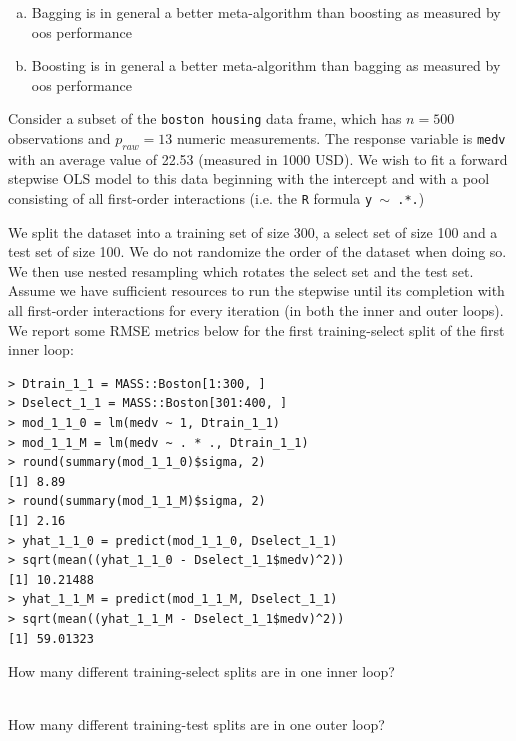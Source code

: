\documentclass[12pt]{article}
\begin{document}
\begin{enumerate}[(a)]
\item[] Bagging is in general a better meta-algorithm than boosting as measured by oos performance
\item[] Boosting is in general a better meta-algorithm than bagging as measured by oos performance
\end{enumerate}
\pagebreak

\eenum

\problem Consider a subset of the \texttt{boston housing} data frame, which has $n = 500$ observations and $p_{raw} = 13$ numeric measurements. The response variable is \texttt{medv} with an average value of 22.53 (measured in 1000 USD). We wish to fit a forward stepwise OLS model to this data beginning with the intercept and with a pool consisting of all first-order interactions (i.e. the \texttt{R} formula \texttt{y $\sim$ .*.}) 

We split the dataset into a training set of size 300, a select set of size 100 and a test set of size 100. We do not randomize the order of the dataset when doing so. We then use nested resampling which rotates the select set and the test set. Assume we have sufficient resources to run the stepwise until its completion with all first-order interactions for every iteration (in both the inner and outer loops). We report some RMSE metrics below for the first training-select split of the first inner loop:

\begin{Verbatim}[frame=single]
> Dtrain_1_1 = MASS::Boston[1:300, ]
> Dselect_1_1 = MASS::Boston[301:400, ]
> mod_1_1_0 = lm(medv ~ 1, Dtrain_1_1)
> mod_1_1_M = lm(medv ~ . * ., Dtrain_1_1)
> round(summary(mod_1_1_0)$sigma, 2)
[1] 8.89
> round(summary(mod_1_1_M)$sigma, 2)
[1] 2.16
> yhat_1_1_0 = predict(mod_1_1_0, Dselect_1_1)
> sqrt(mean((yhat_1_1_0 - Dselect_1_1$medv)^2))
[1] 10.21488
> yhat_1_1_M = predict(mod_1_1_M, Dselect_1_1)
> sqrt(mean((yhat_1_1_M - Dselect_1_1$medv)^2))
[1] 59.01323
\end{Verbatim}

\benum

 How many different training-select splits are in one inner loop?\\~\\

 How many different training-test splits are in one outer loop?\\~\\
\end{document}
